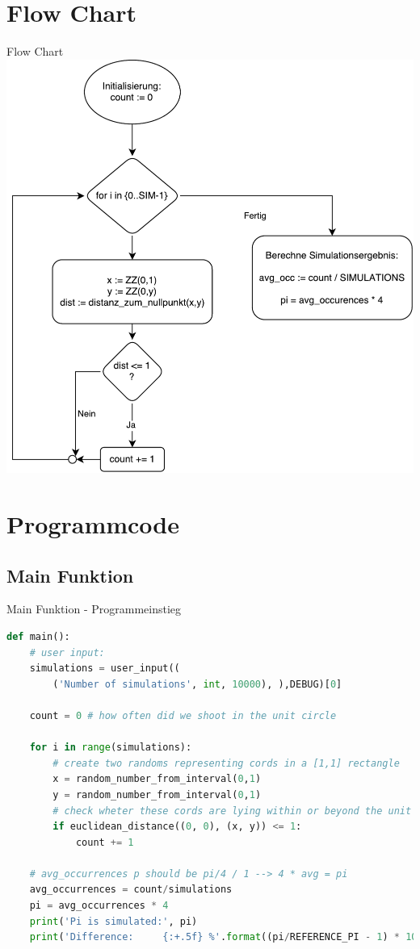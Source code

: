 \section{Flow Chart}
\begin{frame}{Flow Chart}
	\centering
  	\includegraphics[scale=0.4]{BSP13_Flow_Chart.pdf}
\end{frame}

\section{Programmcode}
\subsection{Main Funktion}
\begin{frame}[fragile]{Main Funktion - Programmeinstieg}
  \begin{lstlisting}[language=python]
def main():
    # user input:
    simulations = user_input((
        ('Number of simulations', int, 10000), ),DEBUG)[0]
        
    count = 0 # how often did we shoot in the unit circle
    
    for i in range(simulations):
        # create two randoms representing cords in a [1,1] rectangle
        x = random_number_from_interval(0,1)
        y = random_number_from_interval(0,1)
        # check wheter these cords are lying within or beyond the unit circle
        if euclidean_distance((0, 0), (x, y)) <= 1:
            count += 1
        
    # avg_occurrences p should be pi/4 / 1 --> 4 * avg = pi
    avg_occurrences = count/simulations
    pi = avg_occurrences * 4
    print('Pi is simulated:', pi)
    print('Difference:     {:+.5f} %'.format((pi/REFERENCE_PI - 1) * 100))
\end{lstlisting}
\logopythonbottom
\end{frame}


